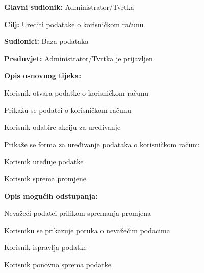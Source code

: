 \noindent {}
\begin{packed_item}
	
	\item \textbf{Glavni sudionik:} Administrator/Tvrtka
	\item  \textbf{Cilj:} Urediti podatake o korisničkom računu
	\item  \textbf{Sudionici:} Baza podataka
	\item  \textbf{Preduvjet:} Administrator/Tvrtka je prijavljen
	\item  \textbf{Opis osnovnog tijeka:}
	
	\item[] \begin{packed_enum}
		
		\item Korisnik otvara podatke o korisničkom računu
		\item Prikažu se podatci o korisničkom računu
		\item Korisnik odabire akciju za uređivanje
		\item Prikaže se forma za uređivanje podataka o korisničkom računu
		\item Korisnik uređuje podatke
		\item Korisnik sprema promjene
	
	\end{packed_enum}
	
	\item  \textbf{Opis mogućih odstupanja:}
	
	\item[] \begin{packed_item}
		
		\item[6.a] Nevažeći podatci prilikom spremanja promjena
		\item[] \begin{packed_enum}
			
			\item Korisniku se prikazuje poruka o nevažećim podacima
			\item Korisnik ispravlja podatke
			\item Korisnik ponovno sprema podatke
			
		\end{packed_enum}
		
	\end{packed_item}
\end{packed_item}

